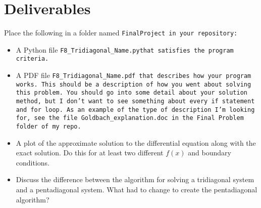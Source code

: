 \documentclass{article}
\newcommand\foldername{\tt{FinalProject} }
\newcommand\filename{\tt{F8\_Tridiagonal\_Name.py}\;\;}
\begin{document}
\section*{Deliverables}
	Place the following in a folder named \foldername in your repository:
	\begin{itemize}
		\item A Python file \filename  that satisfies the program criteria.
		\item A PDF file \tt{F8\_Tridiagonal\_Name.pdf} that describes how your program works.  This should be a description of how you went about solving this problem.  You should go into some detail about your solution method, but I don't want to see something about every \tt{if} statement and \tt{for} loop.  As an example of the type of description I'm looking for, see the file \tt{Goldbach\_explanation.doc} in the \tt{Final Problem} folder of my repo.
		\item A plot of the approximate solution to the differential equation along with the exact solution.  Do this for at least two different $f(x)$ and boundary conditions.
		\item Discuss the difference between the algorithm for solving a tridiagonal system and a pentadiagonal system.  What had to change to create the pentadiagonal algorithm?
		


\end{itemize}	
	

	
\end{document}
